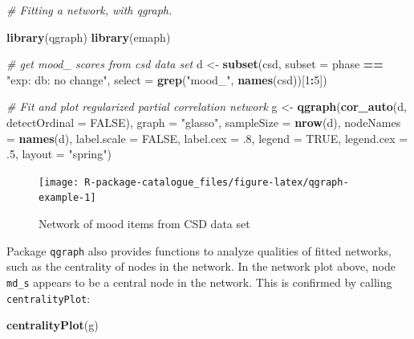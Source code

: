 \documentclass[]{book}
\newenvironment{Shaded}{\begin{snugshade}}{\end{snugshade}}
\newcommand{\KeywordTok}[1]{\textcolor[rgb]{0.13,0.29,0.53}{\textbf{#1}}}
\newcommand{\DataTypeTok}[1]{\textcolor[rgb]{0.13,0.29,0.53}{#1}}
\newcommand{\DecValTok}[1]{\textcolor[rgb]{0.00,0.00,0.81}{#1}}
\newcommand{\StringTok}[1]{\textcolor[rgb]{0.31,0.60,0.02}{#1}}
\newcommand{\CommentTok}[1]{\textcolor[rgb]{0.56,0.35,0.01}{\textit{#1}}}
\newcommand{\OtherTok}[1]{\textcolor[rgb]{0.56,0.35,0.01}{#1}}
\newcommand{\OperatorTok}[1]{\textcolor[rgb]{0.81,0.36,0.00}{\textbf{#1}}}
\newcommand{\NormalTok}[1]{#1}
\begin{document}
\begin{Shaded}
\begin{Highlighting}[]
\CommentTok{# Fitting a network, with qgraph.}

\KeywordTok{library}\NormalTok{(qgraph)}
\KeywordTok{library}\NormalTok{(emaph)}

\CommentTok{# get mood_ scores from csd data set}
\NormalTok{d <-}\StringTok{ }\KeywordTok{subset}\NormalTok{(csd, }
            \DataTypeTok{subset =}\NormalTok{ phase }\OperatorTok{==}\StringTok{ "exp: db: no change"}\NormalTok{, }
            \DataTypeTok{select =} \KeywordTok{grep}\NormalTok{(}\StringTok{"mood_"}\NormalTok{, }\KeywordTok{names}\NormalTok{(csd))[}\DecValTok{1}\OperatorTok{:}\DecValTok{5}\NormalTok{])}


\CommentTok{# Fit and plot regularized partial correlation network}
\NormalTok{g <-}\StringTok{ }\KeywordTok{qgraph}\NormalTok{(}\KeywordTok{cor_auto}\NormalTok{(d, }\DataTypeTok{detectOrdinal =} \OtherTok{FALSE}\NormalTok{),}
       \DataTypeTok{graph =} \StringTok{"glasso"}\NormalTok{, }\DataTypeTok{sampleSize =} \KeywordTok{nrow}\NormalTok{(d),}
       \DataTypeTok{nodeNames =} \KeywordTok{names}\NormalTok{(d),}
       \DataTypeTok{label.scale =} \OtherTok{FALSE}\NormalTok{, }\DataTypeTok{label.cex =}\NormalTok{ .}\DecValTok{8}\NormalTok{, }
       \DataTypeTok{legend =} \OtherTok{TRUE}\NormalTok{, }\DataTypeTok{legend.cex =}\NormalTok{ .}\DecValTok{5}\NormalTok{,}
       \DataTypeTok{layout =} \StringTok{"spring"}\NormalTok{)}
\end{Highlighting}
\end{Shaded}

\begin{figure}

{\centering \texttt{[image: R-package-catalogue\_files/figure-latex/qgraph-example-1]} 

}

\caption{Network of mood items from CSD data set}\label{fig:qgraph-example}
\end{figure}

Package \texttt{qgraph} also provides functions to analyze qualities of
fitted networks, such as the centrality of nodes in the network. In the
network plot above, node \texttt{md\_s} appears to be a central node in
the network. This is confirmed by calling \texttt{centralityPlot}:

\begin{Shaded}
\begin{Highlighting}[]
\KeywordTok{centralityPlot}\NormalTok{(g)}
\end{Highlighting}
\end{Shaded}
\end{document}
